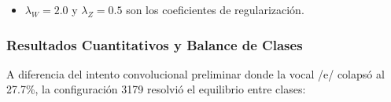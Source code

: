 \documentclass[11pt,a4paper,openany]{book}
\theoremstyle{definition}
\begin{document}
\begin{itemize}
\begin{equation}
        \mathcal{L}_Z = \|\text{Cov}(Z) - I_2\|_F^2
    \end{equation}
    donde $\text{Cov}(Z) = \frac{1}{B-1} \sum_{b=1}^B (z_b - \bar{z})(z_b - \bar{z})^T \in \mathbb{R}^{2 \times 2}$ es la matriz de covarianza muestral del lote latente, $\bar{z} \in \mathbb{R}^2$ es el centroide medio, e $I_2$ es la matriz identidad bidimensional. Esta penalización obliga a que las dos coordenadas $z_1$ y $z_2$ posean varianza unitaria y covarianza cruzada nula, distribuyendo uniformemente la dispersión fonatoria.
    \item $\lambda_W = 2.0$ y $\lambda_Z = 0.5$ son los coeficientes de regularización.
\end{itemize}

\subsubsection{Resultados Cuantitativos y Balance de Clases}
\label{subsubsec:resultados_conv_ortogonal}

A diferencia del intento convolucional preliminar donde la vocal /e/ colapsó al 27.7\%, la configuración 3179 resolvió el equilibrio entre clases:
\end{document}
